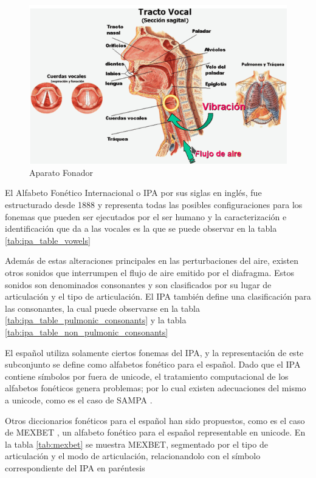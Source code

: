 \begin{figure}[H]
\caption{Aparato Fonador\cite{hableomsDeVoz}}
\label{img:aparato_fonador}
\includegraphics[width=\textwidth]{imagenes/03_02_aparato_fonador.png}
\end{figure}

El Alfabeto Fonético Internacional o IPA por sus siglas en inglés, fue estructurado desde 1888 y representa todas las posibles configuraciones para los fonemas que pueden ser ejecutados por el ser humano y la caracterización e identificación que da a las vocales es la que se puede observar en la tabla \ref{tab:ipa_table_vowels}




Además de estas alteraciones principales en las perturbaciones del aire, existen otros sonidos que interrumpen el flujo de aire emitido por el diafragma. Estos sonidos son denominados consonantes y son clasificados por su lugar de articulación y el tipo de articulación. El IPA también define una clasificación para las consonantes, la cual puede observarse en la tabla \ref{tab:ipa_table_pulmonic_consonants} y la tabla \ref{tab:ipa_table_non_pulmonic_consonants}





El español utiliza solamente ciertos fonemas del IPA, y la representación de este subconjunto se define como alfabetos fonético para el español. Dado que el IPA contiene símbolos por fuera de unicode, el tratamiento computacional de los alfabetos fonéticos genera problemas; por lo cual existen adecuaciones del mismo a unicode, como es el caso de SAMPA \cite{SAMPA}. 

Otros diccionarios fonéticos para el español han sido propuestos, como es el caso de MEXBET \cite{mexbet}, un alfabeto fonético para el español representable en unicode. En la tabla \ref{tab:mexbet} se muestra MEXBET, segmentado por el tipo de articulación y el modo de articulación, relacionandolo con el símbolo correspondiente del IPA en paréntesis

